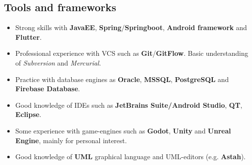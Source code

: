 \documentclass[letterpaper]{twentysecondcv} %
\begin{document}
\newpage %
\normalsize
\makeprofileEmpy %


\subsection{Tools and frameworks}
\small
\begin{itemize}[noitemsep,nolistsep]
	\item Strong skills with \textbf{JavaEE}, \textbf{Spring}/\textbf{Springboot}, \textbf{Android framework} and \textbf{Flutter}.
	\item Professional experience with VCS such as \textbf{Git}/\textbf{GitFlow}. Basic understanding of \textit{Subversion} and \textit{Mercurial}.
	\item Practice with database engines as \textbf{Oracle}, \textbf{MSSQL}, \textbf{PostgreSQL} and \textbf{Firebase Database}.
	\item Good knowledge of IDEs such as \textbf{JetBrains Suite/Android Studio}, \textbf{QT}, \textbf{Eclipse}.
	\item Some experience with game-engines such as \textbf{Godot}, \textbf{Unity} and \textbf{Unreal Engine}, mainly for personal interest.
	\item Good knowledge of \textbf{UML} graphical language and UML-editors (e.g. \textbf{Astah}).
\end{itemize}
\end{document}
